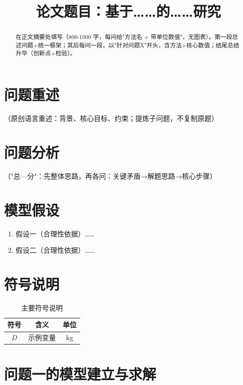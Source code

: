\documentclass{cumcmthesis}
\title{论文题目：基于……的……研究}
\begin{document}
\maketitle

\begin{abstract}
在正文摘要处填写（800-1000 字，每问给"方法名 + 带单位数值"，无图表）。第一段总述问题+统一框架；其后每问一段，以"针对问题X"开头，含方法+核心数值；结尾总结升华（创新点+检验）。
\end{abstract}


\section{问题重述}
（原创语言重述：背景、核心目标、约束；提炼子问题，不复制原题）

\section{问题分析}
（"总—分"：先整体思路，再各问：关键矛盾→解题思路→核心步骤）

\section{模型假设}
\begin{enumerate}
    \item 假设一（合理性依据）……
    \item 假设二（合理性依据）……
\end{enumerate}

\section{符号说明}
\begin{table}[H]
\centering
\caption{主要符号说明}
\begin{tabular}{ccc}
\toprule[0.8pt]
符号 & 含义 & 单位 \\
\midrule[0.5pt]
$D$ & 示例变量 & kg \\
\bottomrule[0.8pt]
\end{tabular}
\end{table}

\section{问题一的模型建立与求解}
\end{document}
